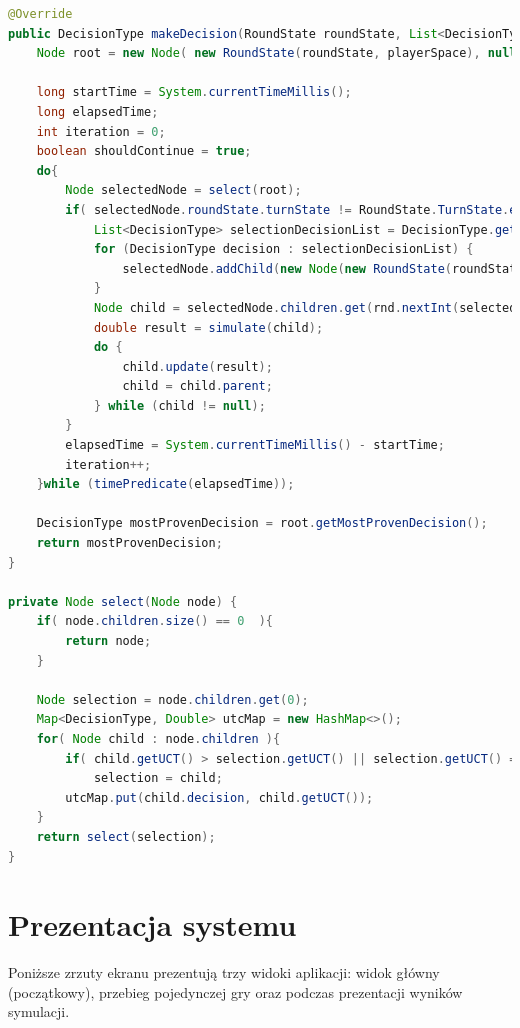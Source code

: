 \begin{lstlisting}[language=java,label=lst:mcts,caption=Wybrane metody klasy MctsAlgorithm, breaklines=true]
@Override
public DecisionType makeDecision(RoundState roundState, List<DecisionType> decisionList) {
	Node root = new Node( new RoundState(roundState, playerSpace), null );
	
	long startTime = System.currentTimeMillis();
	long elapsedTime;
	int iteration = 0;
	boolean shouldContinue = true;
	do{
		Node selectedNode = select(root);
		if( selectedNode.roundState.turnState != RoundState.TurnState.ended ) {
			List<DecisionType> selectionDecisionList = DecisionType.getDecisions(selectedNode.roundState.spaceOfFirstPlayer.hand);
			for (DecisionType decision : selectionDecisionList) {
				selectedNode.addChild(new Node(new RoundState(roundState, roundState.spaceOfFirstPlayer), decision));
			}
			Node child = selectedNode.children.get(rnd.nextInt(selectedNode.children.size()));
			double result = simulate(child);
			do {
				child.update(result);
				child = child.parent;
			} while (child != null);
		}
		elapsedTime = System.currentTimeMillis() - startTime;
		iteration++;
	}while (timePredicate(elapsedTime));
	
	DecisionType mostProvenDecision = root.getMostProvenDecision();
	return mostProvenDecision;
}
    
private Node select(Node node) {
	if( node.children.size() == 0  ){
		return node;
	}
	
	Node selection = node.children.get(0);
	Map<DecisionType, Double> utcMap = new HashMap<>();
	for( Node child : node.children ){
		if( child.getUCT() > selection.getUCT() || selection.getUCT() == 0 )
			selection = child;
		utcMap.put(child.decision, child.getUCT());
	}
	return select(selection);
}

\end{lstlisting}

\section{Prezentacja systemu}
Poniższe zrzuty ekranu prezentują trzy widoki aplikacji: widok główny (początkowy), przebieg pojedynczej gry oraz podczas prezentacji wyników symulacji.
